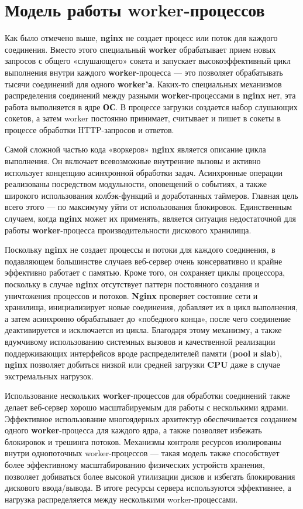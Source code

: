 \documentclass[14pt, a4paper]{article}
\begin{document}
\section*{Модель работы worker-процессов}
Как было отмечено выше, \textbf{nginx} не создает процесс или поток для каждого соединения. 
Вместо этого специальный \textbf{worker} обрабатывает прием новых запросов с общего «слушающего» 
сокета и запускает высокоэффективный цикл выполнения внутри каждого \textbf{worker}-процесса — это 
позволяет обрабатывать тысячи соединений для одного \textbf{worker’а}. Каких-то специальных механизмов 
распределения соединений между разными \textbf{worker}-процессами в \textbf{nginx} нет, эта работа выполняется 
в ядре \textbf{ОС}. В процессе загрузки создается набор слушающих сокетов, а затем worker постоянно 
принимает, считывает и пишет в сокеты в процессе обработки HTTP-запросов и ответов.

Самой сложной частью кода «воркеров» \textbf{nginx} является описание цикла выполнения. 
Он включает всевозможные внутренние вызовы и активно использует концепцию асинхронной 
обработки задач. Асинхронные операции реализованы посредством модульности, оповещений о 
событиях, а также широкого использования колбэк-функций и доработанных таймеров. Главная 
цель всего этого — по максимуму уйти от использования блокировок. Единственным случаем, 
когда \textbf{nginx} может их применять, является ситуация недостаточной для работы \textbf{worker}-процесса 
производительности дискового хранилища.

Поскольку \textbf{nginx} не создает процессы и потоки для каждого соединения, в подавляющем большинстве 
случаев веб-сервер очень консервативно и крайне эффективно работает с памятью. Кроме того, он 
сохраняет циклы процессора, поскольку в случае \textbf{nginx} отсутствует паттерн постоянного создания 
и уничтожения процессов и потоков. \textbf{Nginx} проверяет состояние сети и хранилища, инициализирует 
новые соединения, добавляет их в цикл выполнения, а затем асинхронно обрабатывает до «победного 
конца», после чего соединение деактивируется и исключается из цикла. Благодаря этому механизму, 
а также вдумчивому использованию системных вызовов и качественной реализации поддерживающих 
интерфейсов вроде распределителей памяти (\textbf{pool} и \textbf{slab}), \textbf{nginx} позволяет добиться низкой или 
средней загрузки \textbf{CPU} даже в случае экстремальных нагрузок.

Использование нескольких \textbf{worker}-процессов для обработки соединений также делает веб-сервер 
хорошо масштабируемым для работы с несколькими ядрами. Эффективное использование многоядерных 
архитектур обеспечивается созданием одного \textbf{worker}-процесса для каждого ядра, а также позволяет 
избежать блокировок и трешинга потоков. Механизмы контроля ресурсов изолированы внутри однопоточных 
worker-процессов — такая модель также способствует более эффективному масштабированию физических 
устройств хранения, позволяет добиваться более высокой утилизации дисков и избегать блокирования 
дискового ввода/вывода. В итоге ресурсы сервера используются эффективнее, а нагрузка распределяется
между несколькими worker-процессами.
\end{document}
